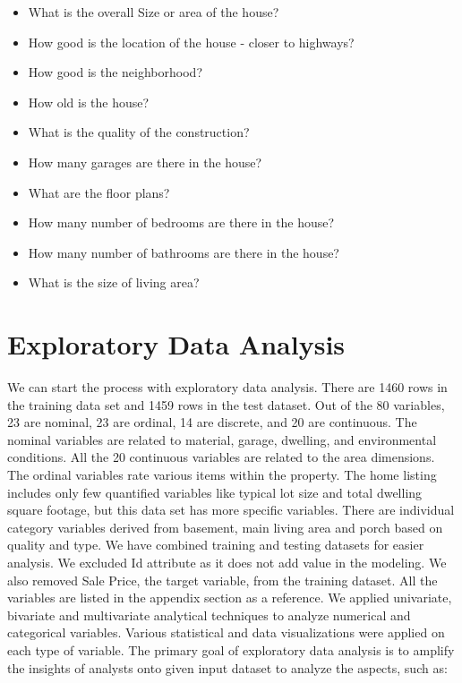 \documentclass[sigconf]{acmart}
\begin{document}
	\begin{itemize}
		\item What is the overall Size or area of the house?
		\item How good is the location of the house - closer to highways?
		\item How good is the neighborhood?
		\item How old is the house?
		\item What is the quality of the construction?
		\item How many garages are there in the house?
		\item What are the floor plans?
		\item How many number of bedrooms are there in the house?
		\item How many number of bathrooms are there in the house?
		\item What is the size of living area?
	\end{itemize}
	
	\section{Exploratory Data Analysis} 
	
	We can start the process with exploratory data analysis. There are 1460 rows in the training data set and 1459 rows in the test dataset. Out of the 80 variables, 23 are nominal, 23 are ordinal, 14 are discrete, and 20 are continuous. The nominal variables are related to material, garage, dwelling, and environmental conditions. All the 20 continuous variables are related to the area dimensions. The ordinal variables rate various items within the property. The home listing includes only few quantified variables like typical lot size and total dwelling square footage, but this data set has more specific variables. There are  individual category variables derived from basement, main living area and porch based on quality and type.  We have combined training and testing datasets for easier analysis. We excluded Id attribute as it does not add value in the modeling. We also removed Sale Price, the target variable, from the training dataset. All the variables are listed in the appendix section as a reference. We applied univariate, bivariate and multivariate analytical techniques to analyze numerical and categorical variables. Various statistical and data visualizations were applied on each type of variable. The primary goal of exploratory data analysis is to amplify the insights of analysts onto given input dataset to analyze the aspects, such as:
	
\end{document}
